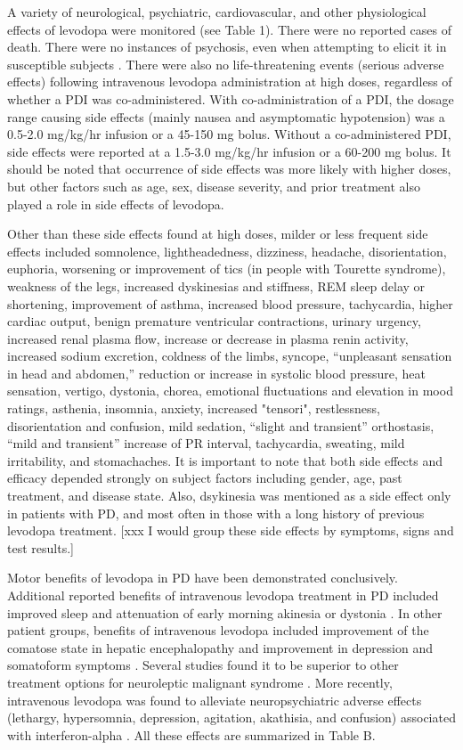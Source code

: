 A variety of neurological, psychiatric, cardiovascular, and other physiological effects of levodopa  were monitored (see Table 1). There were no reported cases of death.  There were no instances of psychosis, even when attempting to elicit it in susceptible subjects \cite{9748031}.  There were also no life-threatening events (serious adverse effects) following intravenous levodopa administration at high doses, regardless of whether a PDI was co-administered.  With co-administration of a PDI, the dosage range causing side effects (mainly nausea and asymptomatic hypotension) was a 0.5-2.0 mg/kg/hr infusion or a 45-150 mg bolus.  Without a co-administered PDI, side effects were reported at a 1.5-3.0 mg/kg/hr infusion or a 60-200 mg bolus. It should be noted that occurrence of side effects was more likely with higher doses, but other factors such as age, sex, disease severity, and prior treatment also played a role in side effects of levodopa.  

Other than these side effects found at high doses, milder or less frequent side effects included somnolence, lightheadedness, dizziness, headache, disorientation, euphoria, worsening or improvement of tics (in people with Tourette syndrome), weakness of the legs, increased dyskinesias and stiffness, REM sleep delay or shortening, improvement of asthma, increased blood pressure, tachycardia, higher cardiac output, benign premature ventricular contractions, urinary urgency, increased renal plasma flow, increase or decrease in plasma renin activity, increased sodium excretion, coldness of the limbs, syncope, “unpleasant sensation in head and abdomen,” reduction or increase in systolic blood pressure, heat sensation, vertigo, dystonia, chorea, emotional fluctuations and elevation in mood ratings, asthenia, insomnia, anxiety, increased "tensori", restlessness, disorientation and confusion, mild sedation, “slight and transient” orthostasis, “mild and transient” increase of PR interval, tachycardia, sweating, mild irritability, and stomachaches.  It is important to note that both side effects and efficacy depended strongly on subject factors including gender, age, past treatment, and disease state.  Also, dsykinesia was mentioned as a side effect only in patients with PD, and most often in those with a long history of previous levodopa treatment. [xxx I would group these side effects by symptoms, signs and test results.]

Motor benefits of levodopa in PD have been demonstrated conclusively. Additional reported benefits of intravenous levodopa treatment in PD included improved sleep \cite{6722513} and attenuation of early morning akinesia or dystonia \cite{3601092}.  In other patient groups, benefits of intravenous levodopa included improvement of the comatose state in hepatic encephalopathy \cite{4544184} and improvement in depression and somatoform symptoms \cite{5898634}.  Several studies found it to be superior to other treatment options for neuroleptic malignant syndrome \cite{9099421}.  More recently, intravenous levodopa was found to alleviate neuropsychiatric adverse effects (lethargy, hypersomnia, depression, agitation, akathisia, and confusion) associated with interferon-alpha \cite{10682234}. All these effects are summarized in Table B.